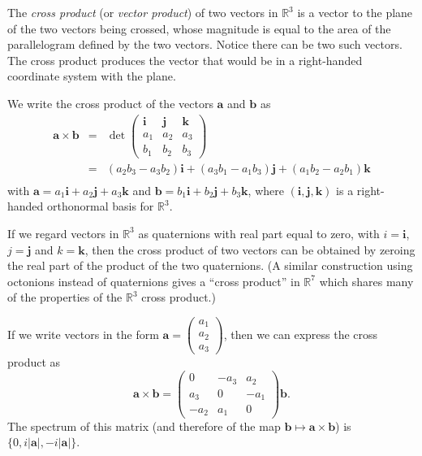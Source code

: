 \documentclass{article}
\def\R{\mathbb{R}}
\def\vec#1{\mathbf{#1}}   %
\begin{document}

The \emph{cross product} (or \emph{vector product}) of two vectors in $\R^3$ is a vector  to the plane of the two vectors being crossed, whose magnitude is equal to the area of the parallelogram defined by the two vectors. Notice there can be two such vectors. The cross product produces the vector that would be in a right-handed coordinate system with the plane.

We write the cross product of the vectors $\vec{a}$ and $\vec{b}$ as
\begin{eqnarray*}
\vec{a}\times\vec{b} &=& \det\left(\begin{array}{ccc}\vec{i} & \vec{j} & \vec{k}\\ a_1 & a_2 & a_3\\ b_1 & b_2 & b_3\end{array}\right) \\
 &=& (a_2b_3-a_3b_2)\vec{i} + (a_3b_1-a_1b_3)\vec{j} + (a_1b_2-a_2b_1)\vec{k} \\
\end{eqnarray*}
with $\vec{a}=a_1\vec{i}+a_2\vec{j}+a_3\vec{k}$ and $\vec{b}=b_1\vec{i} + b_2\vec{j}+b_3\vec{k}$, where $(\vec{i},\vec{j},\vec{k})$ is a right-handed orthonormal basis for $\R^3$.

If we regard vectors in $\R^3$ as quaternions with real part equal to zero, with $i=\vec{i}$, $j=\vec{j}$ and $k=\vec{k}$, then the cross product of two vectors can be obtained by zeroing the real part of the product of the two quaternions. (A similar construction using octonions instead of quaternions gives a ``cross product'' in $\R^7$ which shares many of the properties of the $\R^3$ cross product.)

If we write vectors in the form $\vec{a}=\left(\begin{array}{c}a_1 \\ a_2 \\ a_3\end{array}\right)$, then we can express the cross product as
\[
\vec{a}\times\vec{b} = \left(\begin{array}{ccc}0 & -a_3 & a_2 \\ a_3 & 0 & -a_1 \\ -a_2 & a_1 & 0\end{array}\right)\vec{b}.
\]
The spectrum of this matrix
(and therefore of the map $\vec{b}\mapsto\vec{a}\times\vec{b}$)
is $\{0, i|\vec{a}|, -i|\vec{a}| \}$.
\end{document}
